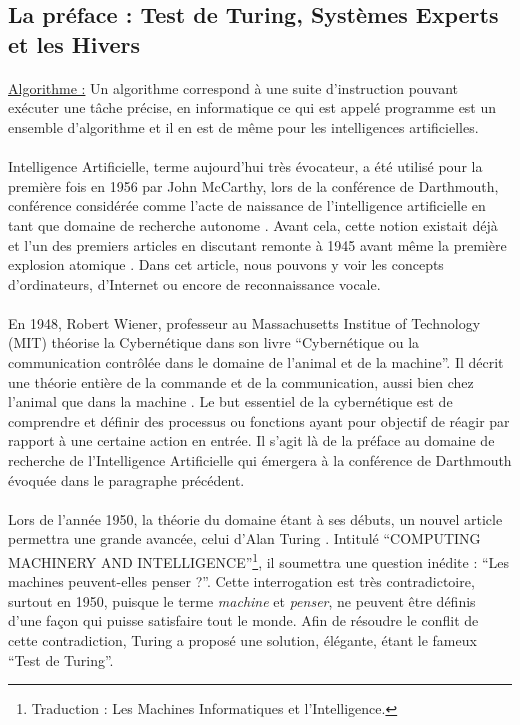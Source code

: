 \documentclass[10pt, french, a4paper]{report}
\begin{document}
\subsection{La préface : Test de Turing, Systèmes Experts et les Hivers}

\paragraph{}\underline{Algorithme :} Un algorithme correspond à une suite d'instruction pouvant exécuter une tâche précise, en informatique ce qui est appelé programme est un ensemble d'algorithme et il en est de même pour les intelligences artificielles.

\paragraph{}
Intelligence Artificielle, terme aujourd’hui très évocateur, a été utilisé pour la première fois en 1956 par John McCarthy, lors de la conférence de Darthmouth, conférence considérée comme l’acte de naissance de l’intelligence artificielle en tant que domaine de recherche autonome \citep{solomonoff_time_1985}. Avant cela, cette notion existait déjà et l'un des premiers articles en discutant remonte à 1945 avant même la première explosion atomique \citep{bush_as_1945}. Dans cet article, nous pouvons y voir les concepts d'ordinateurs, d'Internet ou encore de reconnaissance vocale.

\paragraph{}
En 1948, Robert Wiener, professeur au Massachusetts Institue of Technology (MIT) théorise la Cybernétique dans son livre ``Cybernétique ou la communication contrôlée dans le domaine de l'animal et de la machine''. Il décrit une théorie entière de la commande et de la communication, aussi bien chez l'animal que dans la machine \citep{wiener_cybernetics;_1961}. Le but essentiel de la cybernétique est de comprendre et définir des processus ou fonctions ayant pour objectif de réagir par rapport à une certaine action en entrée. Il s'agit là de la préface au domaine de recherche de l'Intelligence Artificielle qui émergera à la conférence de Darthmouth évoquée dans le paragraphe précédent.

\paragraph{}
Lors de l'année 1950, la théorie du domaine étant à ses débuts, un nouvel article permettra une grande avancée, celui d'Alan Turing \citep{turing_i.computing_1950}. Intitulé ``COMPUTING MACHINERY AND INTELLIGENCE''\footnote{Traduction : Les Machines Informatiques et l'Intelligence.}, il soumettra une question inédite : ``Les machines peuvent-elles penser ?''. Cette interrogation est très contradictoire, surtout en 1950, puisque le terme \textit{machine} et \textit{penser}, ne peuvent être définis d’une façon qui puisse satisfaire tout le monde. Afin de résoudre le conflit de cette contradiction, Turing a proposé une solution, élégante, étant le fameux ``Test de Turing''. 
\end{document}
